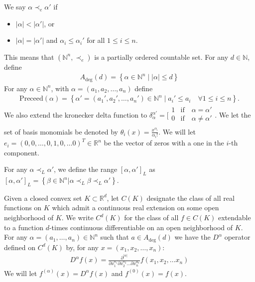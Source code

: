 \documentclass{article}
\theoremstyle{case}
\newcommand{\naturals}{\mathbb N}
\newcommand{\natsn}{\naturals^n}
\newcommand{\Rn}{\mathbb R^n}
\newcommand{\preceed}{{\textrm{Preceed}}}
\newcommand{\ltl}{{\prec_{L}}}
\newcommand{\lte}{{\prec_{e}}}
\newcommand{\Adeg}{{A_{\textrm{deg}}}}
\begin{document}
We say $\alpha \lte \alpha'$ if
\begin{itemize}
\item $|\alpha| < |\alpha'|$, or
\item $|\alpha| = |\alpha'|$ and $\alpha_i \le \alpha_i'$ for all $1 \le i \le n$.
\end{itemize}
This means that $\left(\natsn, \lte\right)$ is a partially ordered countable set.
For any $d \in \naturals$, define
\begin{align}
\Adeg(d) = \left\{ \alpha \in \natsn \; \big| \; |\alpha| \le d \right\}
\end{align}
For any $\alpha \in \natsn$, with $\alpha = (a_1, a_2, \ldots, a_n)$ define 
\begin{align*}
\preceed(\alpha) = \left\{ \alpha' = (a_1', a_2', \ldots, a_n') \in \natsn \; | \; a_i' \le a_i \quad \forall 1 \le i \le n \right\}.
\end{align*}
We also extend the kronecker delta function to $\delta_{\alpha}^{\alpha'} = 
\bigg[
\begin{matrix}
1 & \textrm{if}\quad \alpha = \alpha' \\
0 & \textrm{if}\quad \alpha \ne \alpha' \\
\end{matrix}
$.
We let the set of basis monomials be denoted by $\theta_i(x) = \frac{x^{\alpha_i}}{\alpha_i!}$.
We will let $e_i = (0, 0, \ldots, 0, 1, 0, \ldots 0)^T \in \Rn$ be the vector of zeros with a one in the $i$-th component.



For any $\alpha \ltl \alpha'$, we define the range $[\alpha, \alpha']_L$ as $[\alpha, \alpha']_L = \left\{ \beta \in \natsn | \alpha \ltl \beta \ltl \alpha'  \right\}$.

Given a closed convex set $K \subset \mathbb R^d$, let $C(K)$ designate the class of all real functions on $K$ which admit a continuous real extension on some open neighborhood of $K$.
We write $C^d(K)$ for the class of all $f \in C(K)$ extendable to a function $d$-times continuous differentiable on an open neighborhood of $K$.
For any $\alpha = (a_1, \ldots, a_n) \in \natsn$ such that $a \in \Adeg(d)$
we have the $D^{\alpha}$ operator defined on $C^d(K)$ by, for any $x = (x_1, x_2, \ldots, x_n)$:
\begin{align*}
D^{\alpha} f(x) = \frac{\partial^{|\alpha|}}{\partial x_1^{a_1}\partial x_2^{a_2}\ldots\partial x_n^{a_n} } f(x_1, x_2, \ldots x_n)
\end{align*}
We will let $f^{(\alpha)}(x) = D^{\alpha} f(x)$ and $f^{(0)}(x) = f(x)$.
\end{document}
